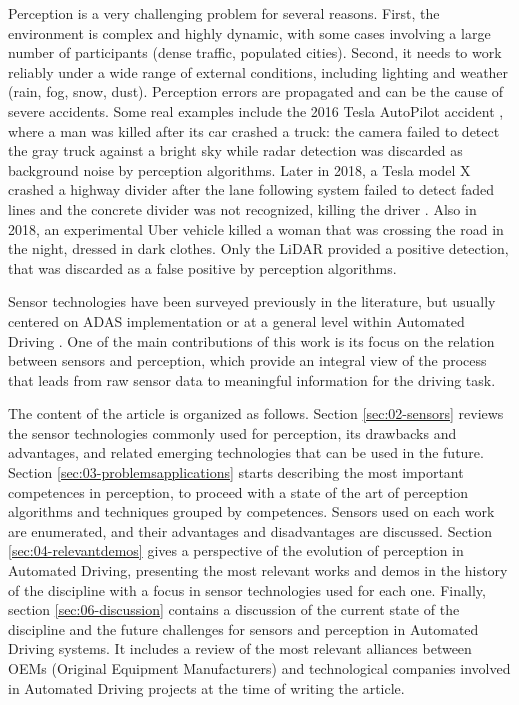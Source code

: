 Perception is a very challenging problem for several
reasons. First, the environment is complex and highly dynamic, with some cases
involving a large number of participants (dense traffic, populated cities). 
Second, it needs to work reliably under a wide range of external conditions, 
including lighting and weather (rain, fog, snow, dust). 
Perception errors are propagated and can be the cause of severe accidents. 
Some real examples include the 2016 Tesla AutoPilot accident \cite{NTSB2017},
where a man was killed after its car crashed a truck: 
the camera failed to detect the gray truck against a bright sky while radar
detection was discarded as background noise by perception algorithms.
Later in 2018, a Tesla model X crashed a highway divider after the lane
following system failed to detect faded lines and the concrete divider was not
recognized, killing the driver \cite{NTSB2018a}.
Also in 2018, an experimental Uber vehicle killed a woman that was
crossing the road \cite{NTSB2018} in the night, dressed in dark clothes. 
Only the LiDAR provided a positive detection, that was discarded as a false
positive by perception algorithms.

Sensor technologies have been surveyed previously in the literature, 
but usually centered on ADAS implementation \cite{Yenkanchi2016,Ziebinski2016a} 
or at a general level within Automated Driving \cite{Pendleton2017}. 
One of the main contributions of this work is its focus on the relation between 
sensors and perception, which provide an integral view of the process that 
leads from raw sensor data to meaningful information for the driving task.

The content of the article is organized as follows. Section 
\ref{sec:02-sensors} reviews the sensor technologies commonly used for 
perception, its drawbacks and advantages, and related emerging 
technologies that can be used in the future. 
Section \ref{sec:03-problemsapplications} starts describing the most important 
competences in perception, to proceed with a state of the art of perception 
algorithms and techniques grouped by competences. Sensors used on each work
are enumerated, and their advantages and disadvantages are discussed. 
Section \ref{sec:04-relevantdemos} gives a perspective of the evolution of
perception in Automated Driving, presenting the most relevant works and demos
in the history of the discipline with a focus in sensor technologies used for
each one. 
Finally, section \ref{sec:06-discussion} contains a discussion of the current
state of the discipline and the future challenges for sensors and perception in
Automated Driving systems. It includes a review of the most relevant alliances 
between OEMs (Original Equipment Manufacturers) and technological companies
involved in Automated Driving projects at the time of writing the article.
